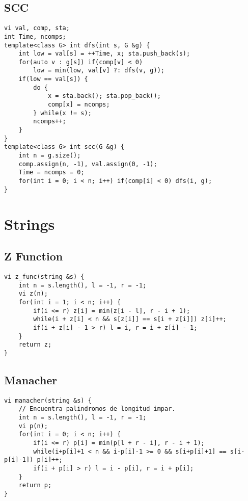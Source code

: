 \documentclass[twocolumn]{article}
\begin{document}
\subsection{SCC}
\lstset{basicstyle=\footnotesize\ttfamily,breaklines=true,tabsize=2,language=C++,frame=leftline, numbers=left, numberstyle=\tiny, numbersep=5pt}
\begin{lstlisting}
vi val, comp, sta;
int Time, ncomps;
template<class G> int dfs(int s, G &g) {
	int low = val[s] = ++Time, x; sta.push_back(s);
	for(auto v : g[s]) if(comp[v] < 0)
		low = min(low, val[v] ?: dfs(v, g));
	if(low == val[s]) {
		do {
			x = sta.back(); sta.pop_back();
			comp[x] = ncomps;
		} while(x != s);
		ncomps++;
	}
}
template<class G> int scc(G &g) {
	int n = g.size();
	comp.assign(n, -1), val.assign(0, -1);
	Time = ncomps = 0;
	for(int i = 0; i < n; i++) if(comp[i] < 0) dfs(i, g);
}
\end{lstlisting}
\section{Strings}
\subsection{Z Function}
\lstset{basicstyle=\footnotesize\ttfamily,breaklines=true,tabsize=2,language=C++,frame=leftline, numbers=left, numberstyle=\tiny, numbersep=5pt}
\begin{lstlisting}
vi z_func(string &s) {
	int n = s.length(), l = -1, r = -1;
	vi z(n);
	for(int i = 1; i < n; i++) {
		if(i <= r) z[i] = min(z[i - l], r - i + 1);
		while(i + z[i] < n && s[z[i]] == s[i + z[i]]) z[i]++;
		if(i + z[i] - 1 > r) l = i, r = i + z[i] - 1;
	}
	return z;
}
\end{lstlisting}
\subsection{Manacher}
\lstset{basicstyle=\footnotesize\ttfamily,breaklines=true,tabsize=2,language=C++,frame=leftline, numbers=left, numberstyle=\tiny, numbersep=5pt}
\begin{lstlisting}
vi manacher(string &s) {
	// Encuentra palindromos de longitud impar.
	int n = s.length(), l = -1, r = -1;
	vi p(n);
	for(int i = 0; i < n; i++) {
		if(i <= r) p[i] = min(p[l + r - i], r - i + 1);
		while(i+p[i]+1 < n && i-p[i]-1 >= 0 && s[i+p[i]+1] == s[i-p[i]-1]) p[i]++;
		if(i + p[i] > r) l = i - p[i], r = i + p[i];
	}
	return p;
}
\end{lstlisting}
\end{document}
